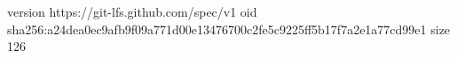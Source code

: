 version https://git-lfs.github.com/spec/v1
oid sha256:a24dea0ec9afb9f09a771d00e13476700c2fe5c9225ff5b17f7a2e1a77cd99e1
size 126

